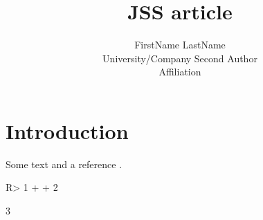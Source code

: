 \documentclass[
  nojss]{jss}
\author{
FirstName LastName\\University/Company \And Second Author\\Affiliation
}
\title{JSS article}
\begin{document}
\hypertarget{introduction}{%
\section{Introduction}\label{introduction}}

Some text and a reference \citep{JSSv059i10}.

\begin{CodeChunk}
\begin{CodeInput}
R> 1 +
+   2
\end{CodeInput}
\begin{CodeOutput}
[1] 3
\end{CodeOutput}
\end{CodeChunk}


\end{document}
